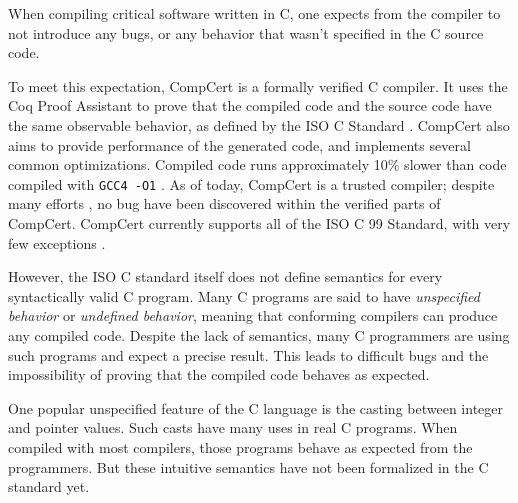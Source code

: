When compiling critical software written in C, one expects from the compiler to not introduce any bugs, or any behavior that wasn't specified in the C source code.

To meet this expectation, CompCert \cite{DBLP:journals/cacm/Leroy09} is a formally verified C compiler.
It uses the Coq Proof Assistant \cite{coq} to prove that the compiled code and the source code have the same observable behavior, as defined by the ISO C Standard \cite{iso}.
CompCert also aims to provide performance of the generated code, and implements several common optimizations. Compiled code runs approximately 10\% slower than code compiled with \texttt{GCC4 -O1} \cite{compcertwebsite}.
As of today, CompCert is a trusted compiler; despite many efforts \cite{DBLP:conf/pldi/YangCER11}, no bug have been discovered within the verified parts of CompCert.
CompCert currently supports all of the ISO C 99 Standard, with very few exceptions \cite{compcertwebsite}.

However, the ISO C standard itself does not define semantics for every syntactically valid C program.
Many C programs are said to have \textit{unspecified behavior} or \textit{undefined behavior}, meaning that conforming compilers can produce any compiled code.
Despite the lack of semantics, many C programmers are using such programs and expect a precise result. %
This leads to difficult bugs \cite{DBLP:conf/apsys/WangCCJZK12} and the impossibility of proving that the compiled code behaves as expected.

One popular unspecified feature of the C language is the casting between integer and pointer values.
Such casts have many uses in real C programs. 
When compiled with most compilers, those programs behave as expected from the programmers. But these intuitive semantics have not been formalized in the C standard yet.

